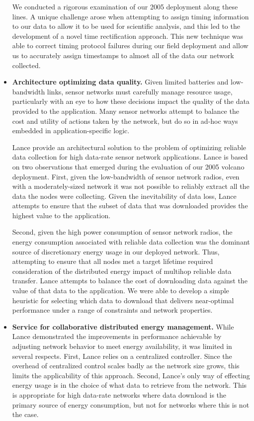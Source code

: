 \begin{itemize}
We conducted a rigorous examination of our 2005 deployment along these lines.
A unique challenge arose when attempting to assign timing information to our
data to allow it to be used for scientific analysis, and this led to the
development of a novel time rectification approach. This new technique was
able to correct timing protocol failures during our field deployment and
allow us to accurately assign timestamps to almost all of the data our
network collected.

\item \textbf{Architecture optimizing data quality.} Given limited batteries
and low-bandwidth links, sensor networks must carefully manage resource
usage, particularly with an eye to how these decisions impact the quality of
the data provided to the application. Many sensor networks attempt to balance
the cost and utility of actions taken by the network, but do so in ad-hoc
ways embedded in application-specific logic.

Lance provide an architectural solution to the problem of optimizing reliable
data collection for high data-rate sensor network applications. Lance is
based on two observations that emerged during the evaluation of our 2005
volcano deployment. First, given the low-bandwidth of sensor network radios,
even with a moderately-sized network it was not possible to reliably extract
all the data the nodes were collecting. Given the inevitability of data loss,
Lance attempts to ensure that the subset of data that was downloaded provides
the highest value to the application.

Second, given the high power consumption of sensor network radios, the energy
consumption associated with reliable data collection was the dominant source
of discretionary energy usage in our deployed network. Thus, attempting to
ensure that all nodes met a target lifetime required consideration of the
distributed energy impact of multihop reliable data transfer. Lance attempts
to balance the cost of downloading data against the value of that data to the
application. We were able to develop a simple heuristic for selecting which
data to download that delivers near-optimal performance under a range of
constraints and network properties.

\item \textbf{Service for collaborative distributed energy management.} While
Lance demonstrated the improvements in performance achievable by adjusting
network behavior to meet energy availability, it was limited in several
respects. First, Lance relies on a centralized controller. Since the overhead
of centralized control scales badly as the network size grows, this limits
the applicability of this approach. Second, Lance's only way of effecting
energy usage is in the choice of what data to retrieve from the network. This
is appropriate for high data-rate networks where data download is the primary
source of energy consumption, but not for networks where this is not the
case.


\end{itemize}
